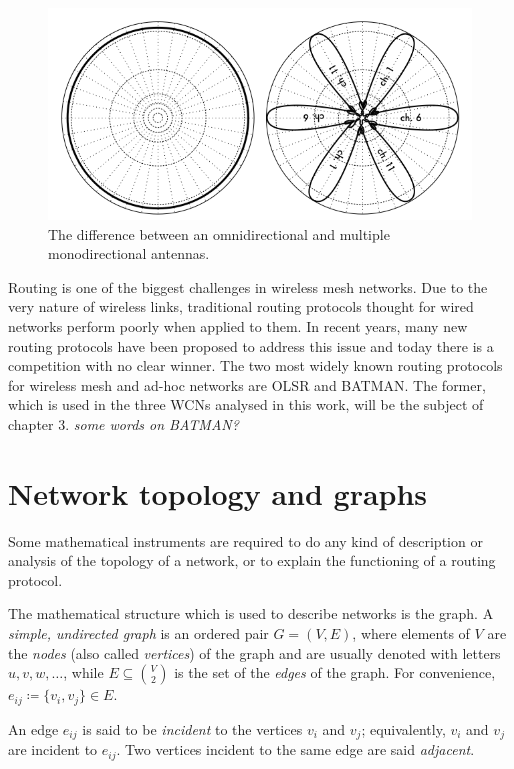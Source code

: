\documentclass[oneside,openany]{memoir}
\begin{document}
\begin{figure}[htbp]
\centering
\includegraphics{./images/directional-antennas.png}
\caption{The difference between an omnidirectional and multiple
monodirectional antennas.}
\end{figure}

Routing is one of the biggest challenges in wireless mesh networks. Due
to the very nature of wireless links, traditional routing protocols
thought for wired networks perform poorly when applied to them. In
recent years, many new routing protocols have been proposed to address
this issue and today there is a competition with no clear winner. The
two most widely known routing protocols for wireless mesh and ad-hoc
networks are OLSR and BATMAN. The former, which is used in the three
WCNs analysed in this work, will be the subject of chapter 3. \emph{some
words on BATMAN?}

\chapter{Network topology and graphs}\label{network-topology-and-graphs}

Some mathematical instruments are required to do any kind of description
or analysis of the topology of a network, or to explain the functioning
of a routing protocol.

The mathematical structure which is used to describe networks is the
graph. A \emph{simple, undirected graph} is an ordered pair
$G = (V, E)$, where elements of $V$ are the \emph{nodes} (also called
\emph{vertices}) of the graph and are usually denoted with letters
$u,v,w,\ldots$, while $E \subseteq \binom{V}{2}$ is the set of the
\emph{edges} of the graph. For convenience,
$e_{ij} \coloneqq \{v_i, v_j\} \in E$.

An edge $e_{ij}$ is said to be \emph{incident} to the vertices $v_i$ and
$v_j$; equivalently, $v_i$ and $v_j$ are incident to $e_{ij}$. Two
vertices incident to the same edge are said \emph{adjacent}.
\end{document}
